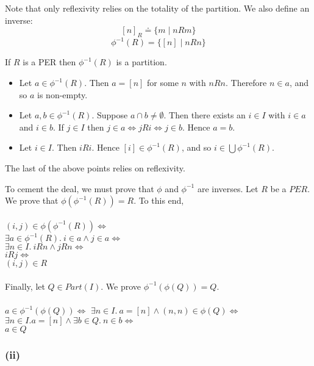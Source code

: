 \documentclass{article}
\begin{document}
Note that only reflexivity relies on the totality of the partition.
We also define an inverse:
$$[n]_R \doteq \{ m \mid nRm \}$$
$$\phi^{-1}(R) = \{ [n] \mid nRn \}$$

If $R$ is a PER then $\phi^{-1}(R)$ is a partition.
\begin{itemize}
\item Let $a \in \phi^{-1}(R)$. Then $a = [n]$ for some $n$ with $nRn$. Therefore $n \in a$, and so $a$ is non-empty.
\item Let $a,b \in \phi^{-1}(R)$. Suppose $a \cap b \neq \emptyset$. Then there exists an $i \in I$ with $i \in a$ and
 $i \in b$. If $j \in I$ then $j \in a \Leftrightarrow jRi \Leftrightarrow j \in b$. Hence $a = b$.
\item Let $i \in I$. Then $iRi$. Hence $[i] \in \phi^{-1}(R)$, and so $i \in \bigcup \phi^{-1}(R)$.
\end{itemize}

The last of the above points relies on reflexivity. 

To cement the deal, we must prove that $\phi$ and $\phi^{-1}$ are inverses.
Let $R$ be a $PER$. We prove that $\phi(\phi^{-1}(R)) = R$. To this end,\\~\\
$(i,j) \in \phi(\phi^{-1}(R)) \Leftrightarrow$\\
$\exists a \in \phi^{-1}(R).~i \in a \wedge j \in a \Leftrightarrow$\\
$\exists n \in I.~iRn \wedge jRn \Leftrightarrow$\\
$iRj \Leftrightarrow$\\
$(i,j) \in R$\\~\\

Finally, let $Q \in Part(I)$. We prove $\phi^{-1}(\phi(Q)) = Q$.\\~\\
$a \in \phi^{-1}(\phi(Q)) \Leftrightarrow$
$\exists n \in I.~a = [n] \wedge (n,n) \in \phi(Q) \Leftrightarrow$\\
$\exists n \in I. a = [n] \wedge \exists b \in Q.~n \in b \Leftrightarrow$\\
$a \in Q$



\subsubsection*{(ii)}
\end{document}
